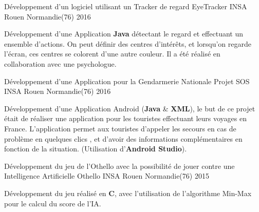 

\begin{cventries}

  \cventry
	{Développement d'un logiciel utilisant un Tracker de regard} %
	{EyeTracker} %
	{INSA Rouen Normandie(76)} %
	{2016} %
	{
		\begin{cvitems} %
			\item {Développement d'une Application \textbf{Java} détectant le regard et effectuant un ensemble d'actions. On peut définir des centres d'intérêts, et lorsqu'on regarde l'écran, ces centres se colorent d'une autre couleur. Il a été réalisé en collaboration avec une psychologue.}
		\end{cvitems}
	}

  \cventry
	{Développement d'une Application pour la Gendarmerie Nationale} %
	{Projet SOS} %
	{INSA Rouen Normandie(76)} %
	{2016} %
	{
		\begin{cvitems} %
			\item {Développement d'une Application Android (\textbf{Java} \& \textbf{XML}), le but de ce projet était de réaliser une application pour les touristes effectuant leurs voyages en France. L'application permet aux touristes d'appeler les secours en cas de problème en quelques clics , et d'avoir des informations complémentaires en fonction de la situation. (Utilisation d'\textbf{Android Studio}). }
		\end{cvitems}
	}

  \cventry
	{Développement du jeu de l'Othello avec la possibilité de jouer contre une Intelligence Artificielle} %
	{Othello} %
	{INSA Rouen Normandie(76)} %
	{2015} %
	{
		\begin{cvitems} %
			\item {Développement du jeu réalisé en \textbf{C}, avec l'utilisation de l'algorithme Min-Max pour le calcul du score de l'IA.}
		\end{cvitems}
	}


\end{cventries}
